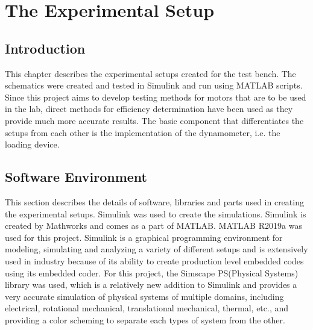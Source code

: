 \chapter{The Experimental Setup} %
\label{Chapter3}

\section{Introduction}

This chapter describes the experimental setups created for the test bench. The schematics were created and tested in Simulink and run using MATLAB scripts. Since this project aims to develop testing methods for motors that are to be used in the lab, direct methods for efficiency determination have been used as they provide much more accurate results. The basic component that differentiates the setups from each other is the implementation of the dynamometer, i.e. the loading device. 

\section{Software Environment}
This section describes the details of software, libraries and parts used in creating the experimental setups. Simulink was used to create the simulations. Simulink is created by Mathworks and comes as a part of MATLAB. MATLAB R2019a was used for this project. Simulink is a graphical programming environment for modeling, simulating and analyzing a variety of different setups and is extensively used in industry because of its ability to create production level embedded codes using its embedded coder. For this project, the Simscape PS(Physical Systems) library was used, which is a relatively new addition to Simulink and provides a very accurate simulation of physical systems of multiple domains, including electrical, rotational mechanical, translational mechanical, thermal, etc., and providing a color scheming to separate each types of system from the other. 

